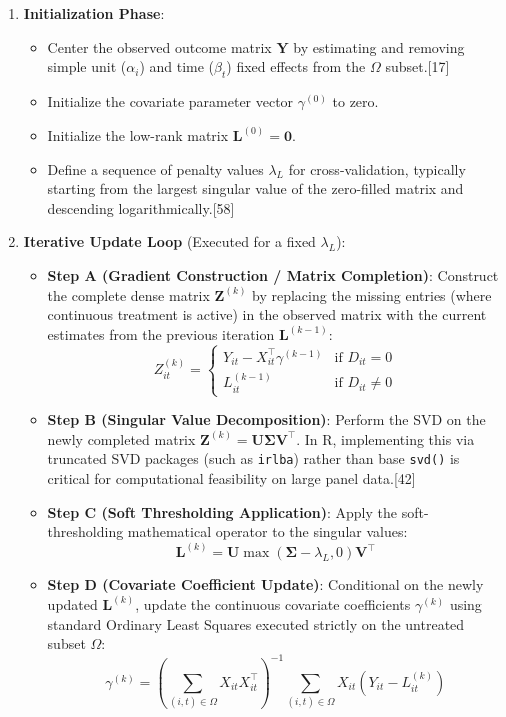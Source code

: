 \documentclass{article}
\begin{document}
\begin{enumerate}
    \item \textbf{Initialization Phase}: 
    \begin{itemize}
        \item Center the observed outcome matrix $\mathbf{Y}$ by estimating and removing simple unit ($\alpha_i$) and time ($\beta_t$) fixed effects from the $\Omega$ subset.[17]
        \item Initialize the covariate parameter vector $\gamma^{(0)}$ to zero.
        \item Initialize the low-rank matrix $\mathbf{L}^{(0)} = \mathbf{0}$.
        \item Define a sequence of penalty values $\lambda_L$ for cross-validation, typically starting from the largest singular value of the zero-filled matrix and descending logarithmically.[58]
    \end{itemize}

    \item \textbf{Iterative Update Loop} (Executed for a fixed $\lambda_L$):
    \begin{itemize}
        \item \textbf{Step A (Gradient Construction / Matrix Completion)}: Construct the complete dense matrix $\mathbf{Z}^{(k)}$ by replacing the missing entries (where continuous treatment is active) in the observed matrix with the current estimates from the previous iteration $\mathbf{L}^{(k-1)}$:
        $$Z_{it}^{(k)} = \begin{cases} Y_{it} - X_{it}^\top \gamma^{(k-1)} & \text{if } D_{it} = 0 \\ L_{it}^{(k-1)} & \text{if } D_{it} \neq 0 \end{cases}$$
        \item \textbf{Step B (Singular Value Decomposition)}: Perform the SVD on the newly completed matrix $\mathbf{Z}^{(k)} = \mathbf{U} \mathbf{\Sigma} \mathbf{V}^\top$. In R, implementing this via truncated SVD packages (such as \texttt{irlba}) rather than base \texttt{svd()} is critical for computational feasibility on large panel data.[42]
        \item \textbf{Step C (Soft Thresholding Application)}: Apply the soft-thresholding mathematical operator to the singular values:
        $$\mathbf{L}^{(k)} = \mathbf{U} \max(\mathbf{\Sigma} - \lambda_L, 0) \mathbf{V}^\top$$
        \item \textbf{Step D (Covariate Coefficient Update)}: Conditional on the newly updated $\mathbf{L}^{(k)}$, update the continuous covariate coefficients $\gamma^{(k)}$ using standard Ordinary Least Squares executed strictly on the untreated subset $\Omega$:
        $$\gamma^{(k)} = \left( \sum_{(i,t) \in \Omega} X_{it} X_{it}^\top \right)^{-1} \sum_{(i,t) \in \Omega} X_{it} (Y_{it} - L_{it}^{(k)})$$
    \end{itemize}


\end{enumerate}
\end{document}
